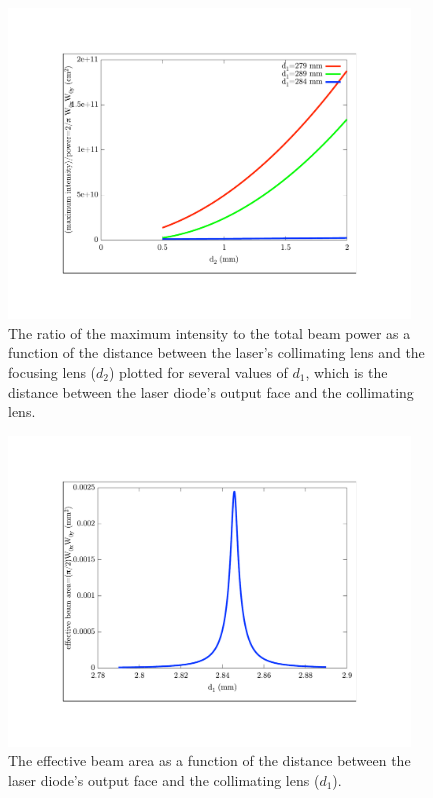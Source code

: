 \begin{figure}
    \centerline{\includegraphics[width=0.95\textwidth]{waists1}}
    \caption[]{\label{waists1} The ratio of the maximum intensity to the total beam power as a function of the distance between the laser's collimating lens and the focusing lens ($d_2$) plotted for several values of $d_1$, which is the distance between the laser diode's output face and the collimating lens.}
\end{figure}

\begin{figure}
    \centerline{\includegraphics[width=0.95\textwidth]{waists2}}
    \caption[]{\label{waists2}
        The effective beam area as a function of the distance between the laser diode's output face and the collimating lens ($d_1$).}
\end{figure}
